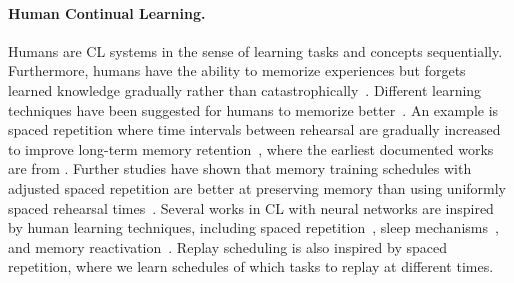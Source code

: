 \paragraph{Human Continual Learning.} Humans are CL systems in the sense of learning tasks and concepts sequentially. Furthermore, humans have the ability to memorize experiences but forgets learned knowledge gradually rather than catastrophically~\citep{french1999catastrophic}. Different learning techniques have been suggested for humans to memorize better~\citep{dunlovsky2013improving, willis2007review}. 
An example is spaced repetition where time intervals between rehearsal are gradually increased to improve long-term memory retention~\citep{dempster1989spacing}, where the earliest documented works are from \citet{ebbinghaus2013memory}. %
Further studies have shown that memory training schedules with adjusted spaced repetition are better at preserving memory than using uniformly spaced rehearsal times~\cite{hawley2008comparison, landauer1978optimum}. 
Several works in CL with neural networks are inspired by %
human learning techniques, including spaced repetition~\citep{amiri2017repeat, feng2019spaced, smolen2016right}, %
sleep mechanisms~\citep{ball2020study, mallya2018packnet, schwarz2018progress}, %
and memory reactivation~\citep{hayes2020remind, van2020brain}. %
Replay scheduling is also inspired by spaced repetition, where %
we learn schedules of which tasks to replay at different times. %

